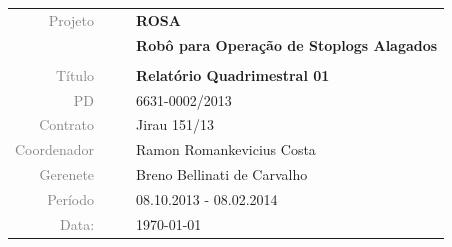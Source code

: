\vspace{4cm}

\begin{table}[ht!]
	\centering
	\begin{tabular}{r l|l p{12cm} }
		\textcolor{gray}{Projeto} &&& \textbf{\Large ROSA}\\
			&&& \textbf{Robô para Operação de Stoplogs Alagados}\\
			&&& \\
		\textcolor{gray}{Título} &&& \textbf{Relatório Quadrimestral 01}\\
		\textcolor{gray}{PD} &&& 6631-0002/2013 \\
		\textcolor{gray}{Contrato} &&& Jirau 151/13\\
		\textcolor{gray}{Coordenador} &&& Ramon Romankevicius Costa \\
		\textcolor{gray}{Gerenete} &&& Breno Bellinati de Carvalho \\
		\textcolor{gray}{Período} &&& 08.10.2013 - 08.02.2014 \\
		\textcolor{gray}{Data:} &&& \today \\
	\end{tabular}
\end{table}


\cleardoublepage


\thispagestyle{empty}


